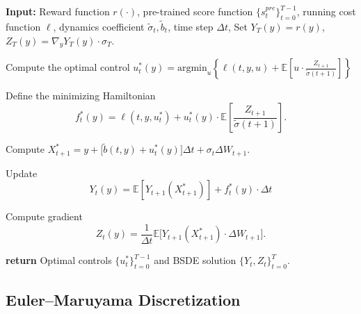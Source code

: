 \documentclass[11pt]{article}
\def\w{\widetilde}
\begin{document}
\begin{algorithm}[H] 
\caption{BSDE-based Fine-Tuning (BSDE-FT)}
\label{alg:bsde-ft}
\begin{algorithmic}[1]
    \STATE \textbf{Input:} Reward function $r(\cdot)$, pre-trained score function $\{s_t^{pre}\}_{t=0}^{T-1}$, running cost function $\ell$, dynamics coefficient $\w{\sigma}_t, \w{b}_t$, time step $\Delta t$,
    \STATE Set $Y_T(y)= r(y)$, $Z_T(y) = \nabla_y Y_T(y) \cdot \sigma_T$.
    
       
        \STATE Compute the optimal control $u^*_t(y) = \mathrm{argmin}_{u} \left\{ \ell(t,y,u) + \mathbb{E}\left[u \cdot \frac{Z_{t+1}}{\w{\sigma}(t+1)}\right] \right\}$
        
         \STATE Define the minimizing Hamiltonian $$f^*_t(y) = \ell(t,y,u^*_t) + u^*_t(y) \cdot \mathbb{E} \left[ \frac{Z_{t+1}}{\w{\sigma}(t+1)} \right].$$
        
        \STATE Compute $X_{t+1}^* = y + \big[\w{b}(t, y) + u^*_t(y)\big]\Delta t + \sigma_t \Delta W_{t+1}$.
    
        \STATE Update
        $$Y_t(y) =  \mathbb{E} \left[ Y_{t+1}(X_{t+1}^*) \right] + f^*_t(y) \cdot \Delta t$$
        
        \STATE Compute gradient 
        $$Z_t(y) = \frac{1}{\Delta t}\mathbb{E} \big[ Y_{t+1}(X_{t+1}^*) \cdot \Delta W_{t+1} \big].$$

    \ENDFOR
    
    \STATE \textbf{return} Optimal controls $\{u^*_t\}_{t=0}^{T-1}$ and BSDE solution $\{Y_t, Z_t\}_{t=0}^T$.
\end{algorithmic}
\end{algorithm}




\subsection{Euler--Maruyama Discretization}
\end{document}
